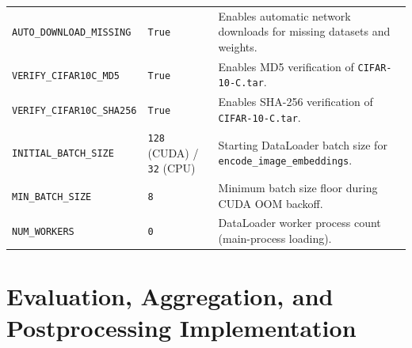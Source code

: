 \documentclass[11pt,a4paper]{article}
\begin{document}
{\begin{longtable}{P{0.31\textwidth} P{0.20\textwidth} P{0.42\textwidth}}
\texttt{AUTO\_\allowbreak{}DOWNLOAD\_\allowbreak{}MISSING} & \texttt{True} & Enables automatic network downloads for missing datasets and weights. \\
\texttt{VERIFY\_\allowbreak{}CIFAR10C\_\allowbreak{}MD5} & \texttt{True} & Enables MD5 verification of \texttt{CIFAR-10-C.tar}. \\
\texttt{VERIFY\_\allowbreak{}CIFAR10C\_\allowbreak{}SHA256} & \texttt{True} & Enables SHA-256 verification of \texttt{CIFAR-10-C.tar}. \\
\texttt{INITIAL\_\allowbreak{}BATCH\_\allowbreak{}SIZE} & \texttt{128} (CUDA) / \texttt{32} (CPU) & Starting DataLoader batch size for \texttt{encode\_\allowbreak{}image\_\allowbreak{}embeddings}. \\
\texttt{MIN\_\allowbreak{}BATCH\_\allowbreak{}SIZE} & \texttt{8} & Minimum batch size floor during CUDA OOM backoff. \\
\texttt{NUM\_\allowbreak{}WORKERS} & \texttt{0} & DataLoader worker process count (main-process loading). \\
\end{longtable}}

\section{Evaluation, Aggregation, and Postprocessing Implementation}
\label{sec:evaluation}
\end{document}
